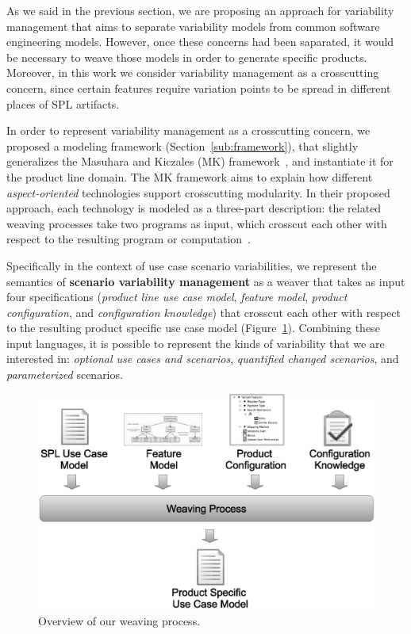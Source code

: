 \documentclass[times, 11pt,twocolumn]{article}
\begin{document}
As we said in the previous section, we are proposing an approach for
variability management that aims to separate variability models
from common software engineering models. However, once these concerns 
had been saparated, it would be necessary to weave those models in order to 
generate specific products. Moreover, in this work we consider variability
management as a crosscutting concern, since certain features require variation
points to be spread in different places of SPL artifacts. 

In order to represent variability management as a crosscutting concern, we
proposed a modeling framework (Section~\ref{sub:framework}), that slightly
generalizes the Masuhara and Kiczales (MK) framework~\cite{Masuhara:2003aa}, and instantiate it for the 
product line domain. The MK framework aims to explain
how different \emph{aspect-oriented} technologies support crosscutting
modularity. In their proposed approach, each technology is modeled as a
three-part description: the related weaving processes take two programs as input, 
which crosscut each other with respect to the resulting program or
computation~\cite{Masuhara:2003aa}.

Specifically in the context of use case scenario variabilities, we represent the
semantics of \textbf{scenario variability management} as a weaver that takes as input four specifications
(\emph{product line use case model}, \emph{feature model}, \emph{product
configuration}, and \emph{configuration knowledge}) that crosscut each other with
respect to the resulting product specific use case model
(Figure~\ref{fig:weave-process}). Combining these input languages, it is possible
to represent the kinds of variability that we are interested in: \emph{optional
use cases and scenarios}, \emph{quantified changed scenarios}, and
\emph{parameterized} scenarios.

\begin{figure}[t]
 \begin{center}
  \includegraphics[scale=0.35]{../images/weave-process.eps}
  \caption{Overview of our weaving process.}
  \label{fig:weave-process}
  \end{center}
\end{figure}
\end{document}
